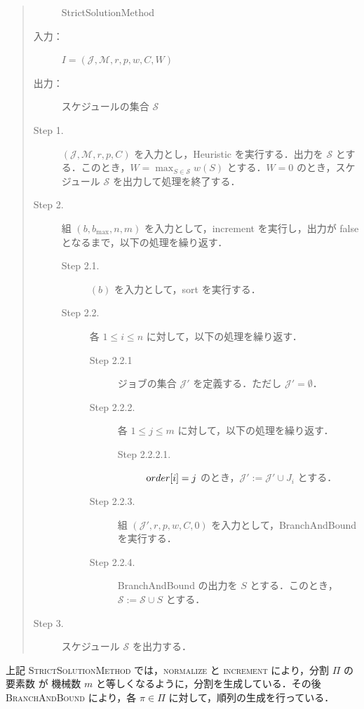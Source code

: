 \documentclass[12pt]{optlab-bachelor}
\begin{document}
\begin{quote}
  \begin{description}
    \item[] {\sc StrictSolutionMethod}
    \item[入力：] $I = (\mathcal{J},\mathcal{M},r,p,w,C,W)$
    \item[出力：] スケジュールの集合 $\mathcal{S}$
  \end{description}
  \begin{description}
    \item[Step 1.] $(\mathcal{J},\mathcal{M},r,p,C)$ を入力とし，{\sc Heuristic} を実行する．出力を $\mathcal{S}$ とする．このとき，$W = {\displaystyle \max_{S \in \mathcal{S}}w(S)}$ とする．$W = 0$ のとき，スケジュール $\mathcal{S}$ を出力して処理を終了する．
    \item[Step 2.] 組 $(b,b_{\max},n,m)$ を入力として，{\sc increment} を実行し，出力が {\sc false} となるまで，以下の処理を繰り返す．
    \begin{description}
      \item[Step 2.1.] $(b)$ を入力として，{\sc sort} を実行する．
      \item[Step 2.2.] 各 $1 \le i \le n$ に対して，以下の処理を繰り返す．
      \begin{description}
        \item[Step 2.2.1] ジョブの集合 $\mathcal{J}'$ を定義する．ただし $\mathcal{J}' = \emptyset$．
        \item[Step 2.2.2.] 各 $1 \le j \le m$ に対して，以下の処理を繰り返す．
        \begin{description}
          \item[Step 2.2.2.1.] ${\mbox order}[i] = j$ のとき，$\mathcal{J}' :=\mathcal{J}' \cup J_i$ とする．
        \end{description}
        \item[Step 2.2.3.] 組 $(\mathcal{J}',r,p,w,C,0)$ を入力として，{\sc BranchAndBound} を実行する．
        \item[Step 2.2.4.] {\sc BranchAndBound} の出力を $S$ とする．このとき，$\mathcal{S} := \mathcal{S} \cup S$ とする．
      \end{description}
    \end{description}
    \item[Step 3.] スケジュール $\mathcal{S}$ を出力する．
  \end{description}
\end{quote}

上記 \textsc{StrictSolutionMethod} では，\textsc{normalize} と \textsc{increment} により，分割 $\Pi$ の要素数 が 機械数 $m$ と等しくなるように，分割を生成している．その後 \textsc{BranchAndBound} により，各 $\pi \in \Pi$ に対して，順列の生成を行っている．
\end{document}
